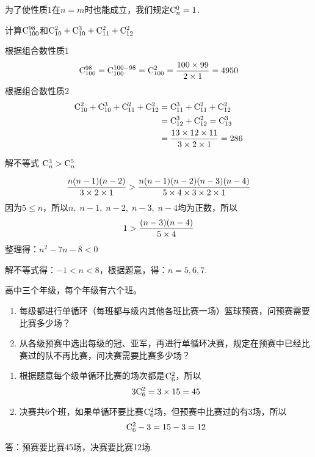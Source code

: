 为了使性质1在$n=m$时也能成立，我们规定${\rm C}^{0}_{n}=1$.

\begin{example}
计算${\rm C}^{98}_{100}$和${\rm C}^{2}_{10}+{\rm C}^{3}_{10}+{\rm C}^{2}_{11}+{\rm C}^{2}_{12}$
\end{example}

\begin{solution}
根据组合数性质1
\[{\rm C}^{98}_{100}={\rm C}^{100-98}_{100}={\rm C}^{2}_{100}=\dfrac{100\times 99}{2\times 1}=4950\]
根据组合数性质2
\[\begin{split}
    {\rm C}^{2}_{10}+{\rm C}^{3}_{10}+{\rm C}^{2}_{11}+{\rm C}^{2}_{12}&={\rm C}^{3}_{11}+{\rm C}^{2}_{11}+{\rm C}^{2}_{12}\\
    &={\rm C}^{3}_{12}+{\rm C}^{2}_{12}={\rm C}^{3}_{13}\\
    &=\dfrac{13\times 12\times 11}{3\times 2\times 1}=286
\end{split}\]
\end{solution}

\begin{example}
    解不等式 ${\rm C}^{3}_{n}>{\rm C}^{5}_{n}$
\end{example}

\begin{solution}
\[\dfrac{n(n-1)(n-2)}{3\times 2\times 1}>\dfrac{n(n-1)(n-2)(n-3)(n-4)}{5\times 4\times 3\times 2\times 1}\]
因为$5\le n$，所以$n,\; n-1,\; n-2,\; n-3,\; n-4$均为正数，所以
\[1>\dfrac{(n-3)(n-4)}{5\times 4}\]
整理得：$n^2-7n-8<0$

解不等式得：$-1<n<8$，根据题意，得：$n=5,6,7$.
\end{solution}



\begin{example}
高中三个年级，每个年级有六个班。
\begin{enumerate}[(1)]
\item 每级都进行单循环（每班都与级内其他各班比赛一场）篮球预赛，问预赛需要比赛多少场？
\item 从各级预赛中选出每级的冠、亚军，再进行单循环决赛，规定在预赛中已经比赛过的队不再比赛，问决赛需要比赛多少场？
\end{enumerate}
\end{example}

\begin{solution}
\begin{enumerate}[(1)]
    \item 根据题意每个级单循环比赛的场次都是${\rm C}^{2}_{6}$，所以
\[3{\rm C}^{2}_{6}=3\times 15=45\]
\item 决赛共6个班，如果单循环要比赛${\rm C}^{2}_{6}$场，但预赛中比赛过的有3场，所以
\[{\rm C}^{2}_{6}-3=15-3=12\]
\end{enumerate}
答：预赛要比赛45场，决赛要比赛12场.
\end{solution}




